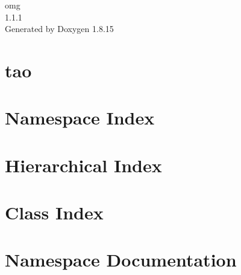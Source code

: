 \let\mypdfximage\pdfximage\def\pdfximage{\immediate\mypdfximage}\documentclass[twoside]{book}
\newcommand{\+}{\discretionary{\mbox{\scriptsize$\hookleftarrow$}}{}{}}
\newcommand{\clearemptydoublepage}{%
  \newpage{\pagestyle{empty}\cleardoublepage}%
}
\begin{document}
\hypersetup{pageanchor=false,
             bookmarksnumbered=true,
             pdfencoding=unicode
            }
\begin{titlepage}
\vspace*{7cm}
\begin{center}%
{\Large omg \\[1ex]\large 1.\+1.\+1 }\\
\vspace*{1cm}
{\large Generated by Doxygen 1.8.15}\\
\end{center}
\end{titlepage}
\clearemptydoublepage
{}
\tableofcontents
\clearemptydoublepage
{}
\hypersetup{pageanchor=true}

\chapter{tao}
\label{md__home_vitorgreati_git-repos_omg_sources_extern_tao__r_e_a_d_m_e}

\chapter{Namespace Index}

\chapter{Hierarchical Index}

\chapter{Class Index}

\chapter{Namespace Documentation}


\end{document}
